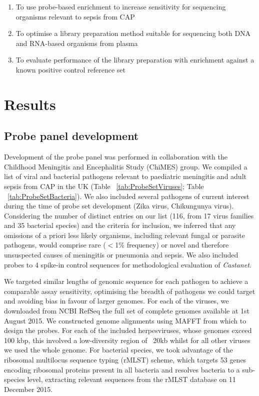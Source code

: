 \begin{enumerate}
	\item To use probe-based enrichment to increase sensitivity for sequencing organisms relevant to sepsis from CAP
	\item To optimise a library preparation method suitable for sequencing both DNA and RNA-based organisms from plasma
	\item To evaluate performance of the library preparation with enrichment against a known positive control reference set
\end{enumerate}

\section{Results}

\subsection{Probe panel development}
Development of the probe panel was performed in collaboration with the Childhood Meningitis and Encephalitis Study (ChiMES) group. We compiled a list of viral and bacterial pathogens relevant to paediatric meningitis and adult sepsis from CAP in the UK (Table ~\ref{tab:ProbeSetViruses}; Table ~\ref{tab:ProbeSetBacteria}). We also included several pathogens of current interest during the time of probe set development (Zika virus, Chikungunya virus). Considering the number of distinct entries on our list (116, from 17 virus families and 35 bacterial species) and the criteria for inclusion, we inferred that any omissions of a priori less likely organisms, including relevant fungal or parasite pathogens, would comprise rare ($<$1\% frequency) or novel and therefore unsuspected causes of meningitis or pneumonia and sepsis. We also included probes to 4 spike-in control sequences for methodological evaluation of \textit{Castanet}.

We targeted similar lengths of genomic sequence for each pathogen to achieve a comparable assay sensitivity, optimising the breadth of pathogens we could target and avoiding bias in favour of larger genomes. For each of the viruses, we downloaded from NCBI RefSeq the full set of complete genomes available at 1st August 2015. We constructed genome alignments using MAFFT from which to design the probes. For each of the included herpesviruses, whose genomes exceed 100 kbp, this involved a low-diversity region of ~20kb whilst for all other viruses we used the whole genome.  For bacterial species, we took advantage of the ribosomal multilocus sequence typing (rMLST) scheme, which targets 53 genes encoding ribosomal proteins present in all bacteria and resolves bacteria to a sub-species level, extracting relevant sequences from the rMLST database on 11 December 2015. 


